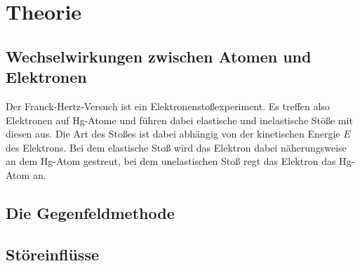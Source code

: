 \section{Theorie}
\label{sec:Theorie}
\subsection{Wechselwirkungen zwischen Atomen und Elektronen}
\label{sec:wechsel}
Der Franck-Hertz-Versuch ist ein Elektronenstoßexperiment. Es treffen also Elektronen auf Hg-Atome und führen dabei elastische und 
inelastische Stöße mit diesen aus. Die Art des Stoßes ist dabei abhängig von der kinetischen Energie $E$ des Elektrons. Bei dem elastische
Stoß wird das Elektron dabei näherungsweise an dem Hg-Atom gestreut, bei dem unelastischen Stoß regt das Elektron das Hg-Atom an. \\
\subsection{Die Gegenfeldmethode}
\label{sec:gegen}
\subsection{Störeinflüsse}
\label{sec:stör}